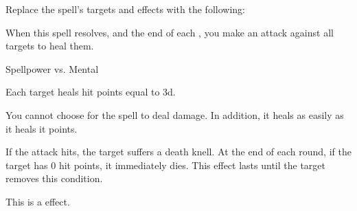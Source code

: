 


Replace the spell's targets and effects with the following:
\begin{spellcontent}

\begin{augmenttargetinginfo}




\end{augmenttargetinginfo}


\begin{augmenteffects}



\spelleffect
When this spell resolves, and the end of each , you make an attack against all targets to heal them.




\begin{spellattack}{Spellpower vs. Mental}


\spellsuccess
Each target heals hit points equal to  \minus3d.



\end{spellattack}





\end{augmenteffects}

\end{spellcontent}






You cannot choose for the spell to deal damage.
In addition, it heals  as easily as it heals it points.







If the attack hits, the target suffers a death knell.
At the end of each round, if the target has 0 hit points, it immediately dies.
This effect lasts until the target removes this condition.



\par


This is a  effect.


